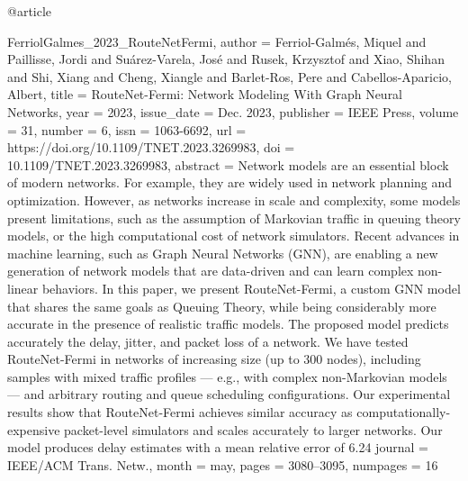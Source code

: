 @article{FerriolGalmes_2023_RouteNetFermi,
author = {Ferriol-Galm\'{e}s, Miquel and Paillisse, Jordi and Su\'{a}rez-Varela, Jos\'{e} and Rusek, Krzysztof and Xiao, Shihan and Shi, Xiang and Cheng, Xiangle and Barlet-Ros, Pere and Cabellos-Aparicio, Albert},
title = {{RouteNet-Fermi: Network Modeling With Graph Neural Networks}},
year = {2023},
issue_date = {Dec. 2023},
publisher = {IEEE Press},
volume = {31},
number = {6},
issn = {1063-6692},
url = {https://doi.org/10.1109/TNET.2023.3269983},
doi = {10.1109/TNET.2023.3269983},
abstract = {Network models are an essential block of modern networks. For example, they are widely used in network planning and optimization. However, as networks increase in scale and complexity, some models present limitations, such as the assumption of Markovian traffic in queuing theory models, or the high computational cost of network simulators. Recent advances in machine learning, such as Graph Neural Networks (GNN), are enabling a new generation of network models that are data-driven and can learn complex non-linear behaviors. In this paper, we present RouteNet-Fermi, a custom GNN model that shares the same goals as Queuing Theory, while being considerably more accurate in the presence of realistic traffic models. The proposed model predicts accurately the delay, jitter, and packet loss of a network. We have tested RouteNet-Fermi in networks of increasing size (up to 300 nodes), including samples with mixed traffic profiles — e.g., with complex non-Markovian models — and arbitrary routing and queue scheduling configurations. Our experimental results show that RouteNet-Fermi achieves similar accuracy as computationally-expensive packet-level simulators and scales accurately to larger networks. Our model produces delay estimates with a mean relative error of 6.24%
journal = {IEEE/ACM Trans. Netw.},
month = may,
pages = {3080–3095},
numpages = {16}
}


}
